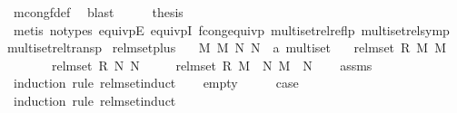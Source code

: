 \begin{isabellebody}
\ mcong{\isacharunderscore}{\kern0pt}f{\isacharunderscore}{\kern0pt}def\ \isamarkupfalse%
\ blast\isanewline
\ \ \isamarkupfalse%
\ \isamarkupfalse%
\ {\isacharquery}{\kern0pt}thesis\isanewline
\ \ \ \ \isamarkupfalse%
\ {\isacharparenleft}{\kern0pt}metis\ {\isacharparenleft}{\kern0pt}no{\isacharunderscore}{\kern0pt}types{\isacharparenright}{\kern0pt}\ equivpE\ equivpI\ fcong{\isacharunderscore}{\kern0pt}equivp\ multiset{\isachardot}{\kern0pt}rel{\isacharunderscore}{\kern0pt}reflp\ multiset{\isachardot}{\kern0pt}rel{\isacharunderscore}{\kern0pt}symp\ multiset{\isachardot}{\kern0pt}rel{\isacharunderscore}{\kern0pt}transp{\isacharparenright}{\kern0pt}\isanewline
{}\isamarkupfalse%
%
\endisatagproof
{\isafoldproof}%
%
\isadelimproof
\isanewline
%
\endisadelimproof
\isanewline
\isanewline
\isanewline
{}\isamarkupfalse%
\ rel{\isacharunderscore}{\kern0pt}mset{\isacharunderscore}{\kern0pt}plus{\isacharcolon}{\kern0pt}\isanewline
\ \ \ M\ M{\isacharprime}{\kern0pt}\ N\ N{\isacharprime}{\kern0pt}\ {\isacharcolon}{\kern0pt}{\isacharcolon}{\kern0pt}\ {\isachardoublequoteopen}{\isacharprime}{\kern0pt}a\ multiset{\isachardoublequoteclose}\isanewline
\ \ \ {\isachardoublequoteopen}rel{\isacharunderscore}{\kern0pt}mset\ R\ M\ M{\isacharprime}{\kern0pt}{\isachardoublequoteclose}\isanewline
\ \ \ \ \ \ \ {\isachardoublequoteopen}rel{\isacharunderscore}{\kern0pt}mset\ R\ N\ N{\isacharprime}{\kern0pt}{\isachardoublequoteclose}\isanewline
\ \ \ \ \ {\isachardoublequoteopen}rel{\isacharunderscore}{\kern0pt}mset\ R\ {\isacharparenleft}{\kern0pt}M\ {\isacharplus}{\kern0pt}\ N{\isacharparenright}{\kern0pt}\ {\isacharparenleft}{\kern0pt}M{\isacharprime}{\kern0pt}\ {\isacharplus}{\kern0pt}\ N{\isacharprime}{\kern0pt}{\isacharparenright}{\kern0pt}{\isachardoublequoteclose}\isanewline
%
\isadelimproof
\ \ %
\endisadelimproof
%
\isatagproof
{}\isamarkupfalse%
\ assms\isanewline
{}\isamarkupfalse%
\ {\isacharparenleft}{\kern0pt}induction\ rule{\isacharcolon}{\kern0pt}\ rel{\isacharunderscore}{\kern0pt}mset{\isacharunderscore}{\kern0pt}induct{\isacharparenright}{\kern0pt}\isanewline
\ \ \isamarkupfalse%
\ empty\isanewline
\ \ \isamarkupfalse%
\ \isamarkupfalse%
\ {\isacharquery}{\kern0pt}case\isanewline
\ \ \isamarkupfalse%
\ {\isacharparenleft}{\kern0pt}induction\ rule{\isacharcolon}{\kern0pt}\ rel{\isacharunderscore}{\kern0pt}mset{\isacharunderscore}{\kern0pt}induct{\isacharparenright}{\kern0pt}\isanewline

\end{isabellebody}
